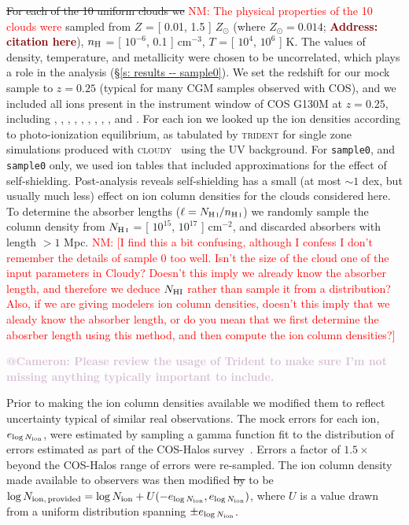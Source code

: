 \documentclass[fleqn,usenatbib]{mnras}
\makeatletter
\newcommand{\todo}[1]{\textcolor{Maroon}{\textbf{Address: #1}}}
\newcommand{\atcameron}[1]{\textcolor{Thistle}{\textbf{@Cameron: #1}}}
\newcommand{\nmr}[1]{\textcolor{red}{NM: #1}}
\makeatother
\begin{document}
\sout{For each of the 10 uniform clouds we} \nmr{The physical properties of the 10 clouds were} sampled from $Z$ = [ 0.01, 1.5 ] $Z_\odot$ (where $Z_\odot = 0.014$; \todo{citation here}), $n_{\rm H}$ = [ $10^{-6}$, 0.1 ] cm$^{-3}$, $T$ = [ $10^4$, $10^6$ ] K.
The values of density, temperature, and metallicity were chosen to be uncorrelated, which plays a role in the analysis (\S\ref{s: results -- sample0}).
We set the redshift for our mock sample to $z=0.25$ (typical for many CGM samples observed with COS), and we included all ions present in the instrument window of COS G130M at $z=0.25$, including , , , , , , ,  , , and .
For each ion we looked up the ion densities according to photo-ionization equilibrium, as tabulated by \textsc{trident} for single zone simulations produced with \textsc{cloudy}~\citep{Ferland2013} using the \cite{Haardt2012} UV background.
For \texttt{sample0}, and \texttt{sample0} only, we used ion tables that included approximations for the effect of self-shielding.
Post-analysis reveals self-shielding has a small (at most $\sim 1$ dex, but usually much less) effect on ion column densities for the clouds considered here.
To determine the absorber lengths ($\ell = N_{\ion{H}{I}} / n_{\ion{H}{I}}$) we randomly sample the  column density from $N_{\ion{H}{I}}$ = [ $10^{15}$, $10^{17}$ ] cm$^{-2}$, and discarded absorbers with length $> 1$ Mpc. \nmr{[I find this a bit confusing, although I confess I don't remember the details of sample 0 too well. Isn't the size of the cloud one of the input parameters in Cloudy? Doesn't this imply we already know the absorber length, and therefore we deduce $N_{\rm HI}$ rather than sample it from a distribution? Also, if we are giving modelers ion column densities, doesn't this imply that we aleady know the absorber length, or do you mean that we first determine the abosrber length using this method, and then compute the ion column densities?]} 

\atcameron{Please review the usage of Trident to make sure I'm not missing anything typically important to include.}

Prior to making the ion column densities available we modified them to reflect uncertainty typical of similar real observations.
The mock errors for each ion, $e_{\log N_{\rm ion}}$, were estimated by sampling a gamma function fit to the distribution of errors estimated as part of the COS-Halos survey~\citep{Werk2013}.
Errors a factor of $1.5\times$ beyond the COS-Halos range of errors were re-sampled.
The ion column density made available to observers was then modified \sout{by} to be $\log N_{\rm ion,\,provided} = \log N_{\rm ion} + U(-e_{\log N_{\rm ion}}, e_{\log N_{\rm ion}} )$, where $U$ is a value drawn from a uniform distribution spanning $\pm e_{\log N_{\rm ion}}$.
\end{document}
